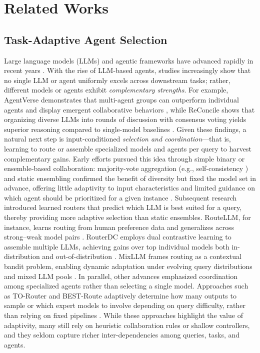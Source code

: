 \documentclass[11pt]{article}
\begin{document}
\newpage
\newpage 


\newpage
\appendix

\section{Related Works}
\subsection{Task-Adaptive Agent Selection}
Large language models (LLMs) and agentic frameworks have advanced rapidly in recent years \cite{zhang2025llms4all}. With the rise of LLM-based agents, studies increasingly show that no single LLM or agent uniformly excels across downstream tasks; rather, different models or agents exhibit \emph{complementary strengths}. For example, AgentVerse demonstrates that multi-agent groups can outperform individual agents and display emergent collaborative behaviors \citep{chen2024agentverse}, while ReConcile shows that organizing diverse LLMs into rounds of discussion with consensus voting yields superior reasoning compared to single-model baselines \citep{chen2024reconcile}. Given these findings, a natural next step is input-conditioned \emph{selection and coordination}—that is, learning to route or assemble specialized models and agents per query to harvest complementary gains. Early efforts pursued this idea through simple binary or ensemble-based collaboration: majority-vote aggregation (e.g., self-consistency \citep{wang2022self}) and static ensembling confirmed the benefit of diversity but fixed the model set in advance, offering little adaptivity to input characteristics and limited guidance on which agent should be prioritized for a given instance \citep{jiang2023llm}.  
Subsequent research introduced learned routers that predict which LLM is best suited for a query, thereby providing more adaptive selection than static ensembles. RouteLLM, for instance, learns routing from human preference data and generalizes across strong–weak model pairs \citep{ong2024routellm}. RouterDC employs dual contrastive learning to assemble multiple LLMs, achieving gains over top individual models both in-distribution and out-of-distribution \citep{chen2024routerdc}. MixLLM frames routing as a contextual bandit problem, enabling dynamic adaptation under evolving query distributions and mixed LLM pools \citep{wang2025mixllm}. In parallel, other advances emphasized coordination among specialized agents rather than selecting a single model. Approaches such as TO-Router and BEST-Route adaptively determine how many outputs to sample or which expert models to involve depending on query difficulty, rather than relying on fixed pipelines \citep{stripelis2024multi, ding2025best}. While these approaches highlight the value of adaptivity, many still rely on heuristic collaboration rules or shallow controllers, and they seldom capture richer inter-dependencies among queries, tasks, and agents.  
\end{document}
